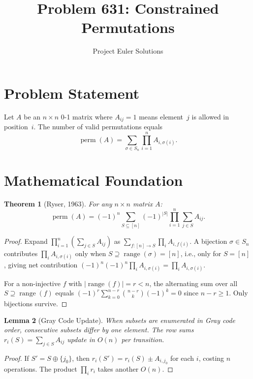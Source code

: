 \documentclass[11pt]{article}
\title{Problem 631: Constrained Permutations}
\author{Project Euler Solutions}
\date{}
\newtheorem{theorem}{Theorem}
\newtheorem{lemma}[theorem]{Lemma}
\begin{document}
\maketitle

\section{Problem Statement}

Let $A$ be an $n \times n$ 0-1 matrix where $A_{ij}=1$ means element~$j$ is allowed in position~$i$. The number of valid permutations equals
\[
\operatorname{perm}(A) = \sum_{\sigma \in S_n} \prod_{i=1}^{n} A_{i,\sigma(i)}.
\]

\section{Mathematical Foundation}

\begin{theorem}[Ryser, 1963]
For any $n \times n$ matrix $A$:
\[
\operatorname{perm}(A) = (-1)^n \sum_{S \subseteq [n]} (-1)^{|S|} \prod_{i=1}^{n} \sum_{j \in S} A_{ij}.
\]
\end{theorem}

\begin{proof}
Expand $\prod_{i=1}^{n}(\sum_{j \in S} A_{ij})$ as $\sum_{f:[n]\to S}\prod_i A_{i,f(i)}$. A bijection $\sigma \in S_n$ contributes $\prod_i A_{i,\sigma(i)}$ only when $S \supseteq \operatorname{range}(\sigma) = [n]$, i.e., only for $S = [n]$, giving net contribution $(-1)^n(-1)^n \prod_i A_{i,\sigma(i)} = \prod_i A_{i,\sigma(i)}$.

For a non-injective $f$ with $|\operatorname{range}(f)|=r<n$, the alternating sum over all $S \supseteq \operatorname{range}(f)$ equals $(-1)^r \sum_{k=0}^{n-r}\binom{n-r}{k}(-1)^k = 0$ since $n-r \ge 1$. Only bijections survive.
\end{proof}

\begin{lemma}[Gray Code Update]
When subsets are enumerated in Gray code order, consecutive subsets differ by one element. The row sums $r_i(S) = \sum_{j \in S}A_{ij}$ update in $O(n)$ per transition.
\end{lemma}

\begin{proof}
If $S' = S \oplus \{j_0\}$, then $r_i(S') = r_i(S) \pm A_{i,j_0}$ for each $i$, costing $n$ operations. The product $\prod_i r_i$ takes another $O(n)$.
\end{proof}
\end{document}
